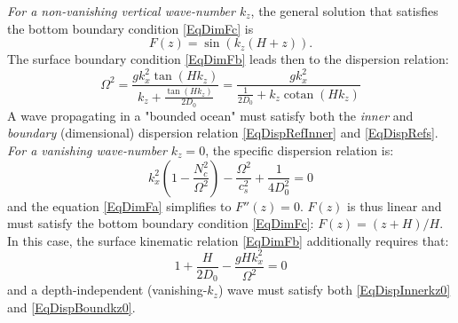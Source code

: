\documentclass[a4paper,11pt]{article}
\DeclareMathOperator{\cotan}{cotan}
\begin{document}
\textit{For a non-vanishing vertical wave-number $k_z$}, the general solution that satisfies the bottom boundary condition \ref{EqDimFc} is
\begin{equation}
	\label{EqDispRef}
  	\displaystyle
  	F(z)=\sin\left(k_z(H+z)\right).
\end{equation}
The surface boundary condition \ref{EqDimFb} leads then to the dispersion relation:
\begin{equation}
	\label{EqDispRefs}
     \Omega^2 =\frac{gk_x^2 \tan(Hk_z)}{k_z +\frac{ \tan(Hk_z)}{2 D_0 }}
    =\frac{gk_x^2 }{\frac{1}{ 2 D_0} + k_z \cotan(Hk_z)}
\end{equation}
A wave propagating in a "bounded ocean" must satisfy both the \textit{inner} and \textit{boundary} (dimensional) dispersion relation \ref{EqDispRefInner} and \ref{EqDispRefs}.\\

\textit{For a vanishing wave-number $k_z=0$}, the specific dispersion relation is:
\begin{equation}
  \label{EqDispInnerkz0}
  \displaystyle
   k_x^2\left(1-\frac{N_c^2}{\Omega^2}\right)
   -\frac{\Omega^2}{c_s^2}+\frac{1}{4D_0^2}=0
\end{equation}
and the equation \ref{EqDimFa} simplifies to $F''(z)=0$. $F(z)$ is thus linear and must satisfy the bottom boundary condition \ref{EqDimFc}: $F(z)=(z+H)/H$. In this case, the surface kinematic relation \ref{EqDimFb} additionally requires that:
\begin{equation}
    \displaystyle
    \label{EqDispBoundkz0}
    1+\frac{H}{2 D_0} 
    - \frac{gH k_x^2}{\Omega^2} = 0
\end{equation}
and a depth-independent (vanishing-$k_z$) wave must satisfy both \ref{EqDispInnerkz0} and \ref{EqDispBoundkz0}. 
\end{document}

